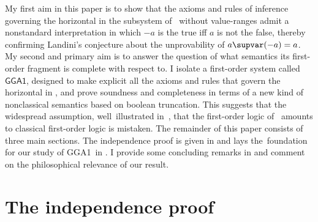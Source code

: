 \documentclass{preprint}
\newcommand{\GGA}{\textsf{GGA1}}
\renewcommand{\to}{\supvar}
\begin{document}
\newpage

My first aim in this paper is to show that the axioms and rules of inference governing the horizontal in the subsystem of \gga~without value-ranges admit a nonstandard interpretation in which $-a$ is the true iff $a$ is not the false, thereby confirming Landini's conjecture about the unprovability of $a \to (-a)=a$. My second and primary aim is to answer the question of what semantics its first-order fragment is complete with respect to. I isolate a first-order system called~$\GGA$, designed to make explicit all the axioms and rules that govern the horizontal in \gga, and prove soundness and completeness in terms of a new kind of nonclassical semantics based on boolean truncation. 
This suggests that the widespread assumption, well~illustrated in~\cite{parsons1987consistency}, that the first-order logic of \gga~amounts to classical first-order logic is mistaken. 
The remainder of this paper consists of three main sections. 
The independence proof is given in  and lays the~foundation for our study of \GGA~in . 
I provide some concluding remarks in  and comment on the philosophical relevance of our result. 


\section{The independence proof} \label{sec:independence}
\end{document}
